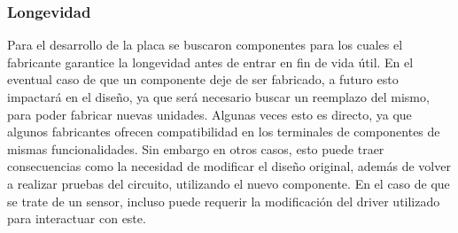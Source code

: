 





\subsubsection{Longevidad}


Para el desarrollo de la placa se buscaron componentes para los cuales el fabricante garantice la longevidad antes de entrar en fin de vida útil. En el eventual caso de que un componente deje de ser fabricado, a futuro esto impactará en el diseño, ya que será necesario buscar un reemplazo del mismo, para poder fabricar nuevas unidades. Algunas veces esto es directo, ya que algunos fabricantes ofrecen compatibilidad en los terminales de componentes de mismas funcionalidades. Sin embargo en otros casos, esto puede traer consecuencias como la necesidad de modificar el diseño original, además de volver a realizar pruebas del circuito, utilizando el nuevo componente. En el caso de que se trate de un sensor, incluso puede requerir la modificación del driver utilizado para interactuar con este.

